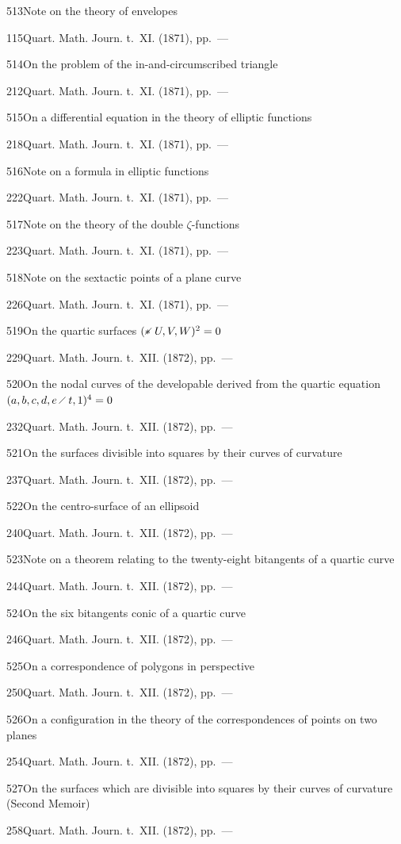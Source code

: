 \documentclass[11pt,a4paper]{book}
\providecommand{\tocentry}[2]{#1\dotfill #2\par}
\begin{document}
\tocentry{513}{Note on the theory of envelopes}{115}{Quart. Math. Journ. t.~XI. (1871), pp.~---}

\tocentry{514}{On the problem of the in-and-circumscribed triangle}{212}{Quart. Math. Journ. t.~XI. (1871), pp.~---}

\tocentry{515}{On a differential equation in the theory of elliptic functions}{218}{Quart. Math. Journ. t.~XI. (1871), pp.~---}

\tocentry{516}{Note on a formula in elliptic functions}{222}{Quart. Math. Journ. t.~XI. (1871), pp.~---}

\tocentry{517}{Note on the theory of the double $\zeta$-functions}{223}{Quart. Math. Journ. t.~XI. (1871), pp.~---}

\newpage

\tocentry{518}{Note on the sextactic points of a plane curve}{226}{Quart. Math. Journ. t.~XI. (1871), pp.~---}

\tocentry{519}{On the quartic surfaces $(* \!\!\! \raisebox{0.3ex}{\scriptsize$\diagup$} \, U, V, W)^2 = 0$}{229}{Quart. Math. Journ. t.~XII. (1872), pp.~---}

\tocentry{520}{On the nodal curves of the developable derived from the quartic equation $(a, b, c, d, e \,\raisebox{0.3ex}{\scriptsize$\diagup$}\, t, 1)^4 = 0$}{232}{Quart. Math. Journ. t.~XII. (1872), pp.~---}

\tocentry{521}{On the surfaces divisible into squares by their curves of curvature}{237}{Quart. Math. Journ. t.~XII. (1872), pp.~---}

\tocentry{522}{On the centro-surface of an ellipsoid}{240}{Quart. Math. Journ. t.~XII. (1872), pp.~---}

\tocentry{523}{Note on a theorem relating to the twenty-eight bitangents of a quartic curve}{244}{Quart. Math. Journ. t.~XII. (1872), pp.~---}

\tocentry{524}{On the six bitangents conic of a quartic curve}{246}{Quart. Math. Journ. t.~XII. (1872), pp.~---}

\tocentry{525}{On a correspondence of polygons in perspective}{250}{Quart. Math. Journ. t.~XII. (1872), pp.~---}

\tocentry{526}{On a configuration in the theory of the correspondences of points on two planes}{254}{Quart. Math. Journ. t.~XII. (1872), pp.~---}

\tocentry{527}{On the surfaces which are divisible into squares by their curves of curvature (Second Memoir)}{258}{Quart. Math. Journ. t.~XII. (1872), pp.~---}
\end{document}
